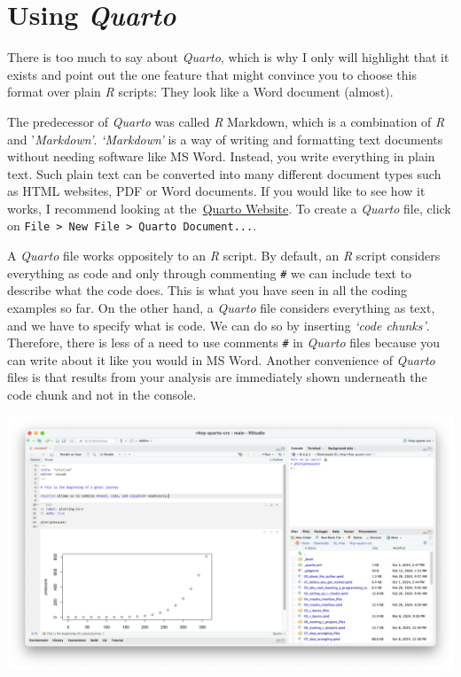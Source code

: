 \documentclass[
  letterpaper,
]{krantz}
\begin{document}
\section{\texorpdfstring{Using
\emph{Quarto}}{Using Quarto}}\label{sec-r-markdown-and-r-notebooks}

There is too much to say about \emph{Quarto}, which is why I only will
highlight that it exists and point out the one feature that might
convince you to choose this format over plain \emph{R} scripts: They
look like a Word document (almost).

The predecessor of \emph{Quarto} was called \emph{R} Markdown, which is
a combination of \emph{R} and '\emph{Markdown'}. \emph{`Markdown'} is a
way of writing and formatting text documents without needing software
like MS Word. Instead, you write everything in plain text. Such plain
text can be converted into many different document types such as HTML
websites, PDF or Word documents. If you would like to see how it works,
I recommend looking at the~\hyperref[0]{Quarto Website}. To create a
\emph{Quarto} file, click on
\texttt{File\ \textgreater{}\ New\ File\ \textgreater{}\ Quarto\ Document...}.

A \emph{Quarto} file works oppositely to an \emph{R} script. By default,
an \emph{R} script considers everything as code and only through
commenting \texttt{\#} we can include text to describe what the code
does. This is what you have seen in all the coding examples so far. On
the other hand, a \emph{Quarto} file considers everything as text, and
we have to specify what is code. We can do so by inserting \emph{`code
chunks'}. Therefore, there is less of a need to use comments \texttt{\#}
in \emph{Quarto} files because you can write about it like you would in
MS Word. Another convenience of \emph{Quarto} files is that results from
your analysis are immediately shown underneath the code chunk and not in
the console.

\includegraphics{images/chapter_06_img/03_r_markdown/01_quarto_plain.png}
\end{document}
